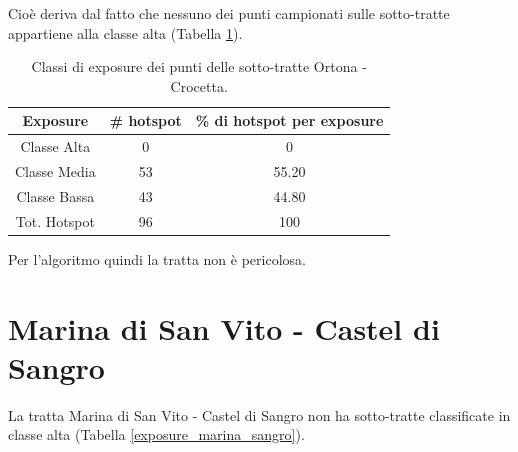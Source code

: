 Cioè deriva dal fatto che nessuno dei punti campionati sulle sotto-tratte appartiene alla classe alta (Tabella \ref{risultati_ortona_crocetta}).

\begin{table}[H]
	\centering
	\begin{tabular}{|c|c|c|}
		\hline
		\rowcolor[HTML]{C0C0C0} 
		\textbf{Exposure} & \textbf{\# hotspot} & \textbf{\% di hotspot per exposure} \\ \hline
		Classe Alta       & 0                  & 0                                   \\ \hline
		Classe Media      & 53                  & 55.20                           \\ \hline
		Classe Bassa      & 43                & 44.80                               \\ \hline
		Tot. Hotspot      & 96               & 100                                 \\ \hline
	\end{tabular}
	\caption{Classi di exposure dei punti delle sotto-tratte Ortona - Crocetta. }
	\label{risultati_ortona_crocetta}
\end{table}

Per l'algoritmo quindi la tratta non è pericolosa.

\section{Marina di San Vito - Castel di Sangro}
La tratta Marina di San Vito - Castel di Sangro non ha sotto-tratte classificate in classe alta (Tabella \ref{exposure_marina_sangro}). 

